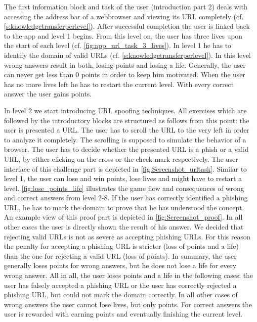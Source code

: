 \begin{description}[leftmargin=0cm]
	\item[Obtaining Basic Knowledge]  
The first information block and task of the user (introduction part 2) deals with accessing the address bar of a webbrowser and viewing its URL completely (cf. \autoref{s:knowledgetransferperlevel}).
 After successful completion the user is linked back to the app and level 1 begins.
 From this level on, the user has three lives upon the start of each level (cf. \autoref{fig:app_url_task_3_lives}).
 In level 1 he has to identify the domain of valid URLs (cf. \autoref{s:knowledgetransferperlevel}).
 In this level wrong answers result in both, losing points and losing a life.
 Generally, the user can never get less than 0 points in order to keep him motivated.
 When the user has no more lives left he has to restart the current level.
 With every correct answer the user gains points.
	\item[The Actual Game]  In level 2 we start introducing URL spoofing techniques. 
All exercises which are followed by the introductory blocks are structured as follows from this point: the user is presented a URL.
The user has to scroll the URL to the very left in order to analyze it completely.
The scrolling is supposed to simulate the behavior of a browser.
The user has to decide whether the presented URL is a phish or a valid URL, by either clicking on the cross or the check mark respectively.
The user interface of this challenge part is depicted in \autoref{fig:Screenshot_urltask}.
 Similar to level 1, the user can lose and win points, lose lives and might have to restart a level.
\autoref{fig:lose_points_life} illustrates the game flow and consequences of wrong and correct answers from level 2-8.
 If the user has correctly identified a phishing URL, he has to mark the domain to prove that he has understood the concept.
An example view of this proof part is depicted in \autoref{fig:Screenshot_proof}.
 In all other cases the user is directly shown the result of his answer.
 We decided that rejecting valid URLs is not as severe as accepting phishing URLs.
 For this reason the penalty for accepting a phishing URL is stricter (loss of points and a life) than the one for rejecting a valid URL (loss of points).
 In summary, the user generally loses points for wrong answers, but he does not lose a life for every wrong answer.
 All in all, the user loses points and a life in the following cases: the user has falsely accepted a phishing URL or the user has correctly rejected a phishing URL, but could not mark the domain correctly. In all other cases of wrong answers the user cannot lose lives, but only points.
For correct answers the user is rewarded with earning points and eventually finishing the current level.
\end{description}


